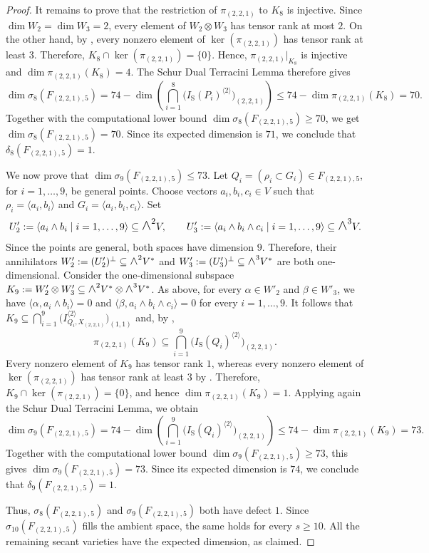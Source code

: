 \documentclass[a4paper,reqno]{amsart}
\theoremstyle{plainnopunct}
\theoremstyle{definitionnopunct}
\newcommand{\superwedge}{\mathlarger{\mathlarger{\wedge}}}
\begin{document}
\begin{proof}
It remains to prove that the restriction of $\pi_{(2,2,1)}$ to $K_8$ is injective. Since $\dim W_2=\dim W_3=2$, every element of $W_2\otimes W_3$ has tensor rank at most $2$. On the other hand, by , every nonzero element of $\ker(\pi_{(2,2,1)})$ has tensor rank at least $3$. Therefore, $K_8\cap\ker(\pi_{(2,2,1)})=\{0\}$. Hence, $\pi_{(2,2,1)}|_{K_8}$ is injective and $\dim\pi_{(2,2,1)}(K_8)=4$. The Schur Dual Terracini Lemma therefore gives
\[
\dim\sigma_8(F_{(2,2,1),5})
=74-\dim\left(\bigcap_{i=1}^8 \bigl(I_{\mathrm S}(P_i)^{\langle 2\rangle}\bigr)_{(2,2,1)}\right)
\leq 74-\dim\pi_{(2,2,1)}(K_8)
=70.
\]
Together with the computational lower bound $\dim\sigma_8(F_{(2,2,1),5})\geq70$, we get $\dim\sigma_8(F_{(2,2,1),5})=70$. Since its expected dimension is $71$, we conclude that $\delta_8(F_{(2,2,1),5})=1$.

We now prove that $\dim\sigma_9(F_{(2,2,1),5})\leq73$. Let $Q_i=(\rho_i\subset G_i)\in F_{(2,2,1),5}$, for $i=1,\dots,9$, be general points. Choose vectors $a_i,b_i,c_i\in V$ such that $\rho_i=\langle a_i,b_i\rangle$ and $G_i=\langle a_i,b_i,c_i\rangle$. Set
\[
U'_2:=\left\langle a_i\wedge b_i\mid i=1,\dots,9\right\rangle\subseteq\superwedge^2V,\qquad
U'_3:=\left\langle a_i\wedge b_i\wedge c_i\mid i=1,\dots,9\right\rangle\subseteq\superwedge^3V.
\]
Since the points are general, both spaces have dimension $9$. Therefore, their annihilators $W'_2:=(U'_2)^\perp\subseteq\superwedge^2V^*$ and $W'_3:=(U'_3)^\perp\subseteq\superwedge^3V^*$ are both one-dimensional. Consider the one-dimensional subspace $K_9:=W'_2\otimes W'_3\subseteq\superwedge^2V^*\otimes\superwedge^3V^*$. As above, for every $\alpha\in W'_2$ and $\beta\in W'_3$, we have $\langle\alpha,a_i\wedge b_i\rangle=0$ and $\langle\beta,a_i\wedge b_i\wedge c_i\rangle=0$ for every $i=1,\dots,9$. It follows that {$K_9\subseteq\bigcap_{i=1}^9\bigl(I_{Q_i,X_{(2,2,1)}}^{\langle 2\rangle}\bigr)_{(1,1)}$} and, by ,
\[
\pi_{(2,2,1)}(K_9)\subseteq\bigcap_{i=1}^9\bigl(I_{\mathrm S}(Q_i)^{\langle2\rangle}\bigr)_{(2,2,1)}.
\]
Every nonzero element of $K_9$ has tensor rank $1$, whereas every nonzero element of $\ker(\pi_{(2,2,1)})$ has tensor rank at least $3$ by . Therefore, $K_9\cap\ker(\pi_{(2,2,1)})=\{0\}$, and hence $\dim\pi_{(2,2,1)}(K_9)=1$. Applying again the Schur Dual Terracini Lemma, we obtain
\[
\dim\sigma_9(F_{(2,2,1),5})
=74-\dim\left(\bigcap_{i=1}^9 \bigl(I_{\mathrm S}(Q_i)^{\langle2\rangle}\bigr)_{(2,2,1)}\right)
\leq74-\dim\pi_{(2,2,1)}(K_9)
=73.
\]
Together with the computational lower bound $\dim\sigma_9(F_{(2,2,1),5})\geq73$, this gives $\dim\sigma_9(F_{(2,2,1),5})=73$. Since its expected dimension is $74$, we conclude that $\delta_9(F_{(2,2,1),5})=1$.

Thus, $\sigma_8(F_{(2,2,1),5})$ and $\sigma_9(F_{(2,2,1),5})$ both have defect $1$. Since $\sigma_{10}(F_{(2,2,1),5})$ fills the ambient space, the same
holds for every $s\geq10$. All the remaining secant varieties have the expected dimension, as claimed.
\end{proof}
\end{document}
